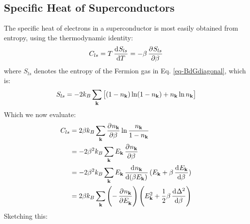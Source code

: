 \subsection{Specific Heat of Superconductors}
The specific heat of electrons in a superconductor is most easily obtained from entropy, using the thermodynamic identity:
\begin{equation}
    C_{ls} = T\dod{S_{ls}}{T} = -\beta\dpd{S_{ls}}{\beta}
\end{equation}
where $S_{ls}$ denotes the entropy of the Fermion gas in Eq. \eqref{eq-BdGdiagonal}, which is:
\begin{equation}
    S_{ls} = -2k_B\sum_{\mathbf{k}}\left[(1-n_{\mathbf{k}})\ln(1 - n_{\mathbf{k}}) + n_{\mathbf{k}}\ln n_{\mathbf{k}}\right]
\end{equation}
Which we now evaluate:
\begin{equation}
    \begin{split}
        C_{ls} &= 2\beta k_B \sum_{\v{k}}\dpd{n_{\v{k}}}{\beta}\ln\frac{n_{\v{k}}}{1 - n_{\v{k}}} 
        \\ &= -2\beta^2 k_B \sum_{\v{k}}E_{\v{k}}\dpd{n_{\v{k}}}{\beta}
        \\ &= -2\beta^2k_B\sum_{\v{k}}E_{\v{k}} \dod{n_{\v{k}}}{(\beta E_{\v{k}})}(E_{\v{k}} + \beta \dod{E_{\v{k}}}{\beta})
        \\ &= 2\beta k_B \sum_{\v{k}}\left(-\dpd{n_{\v{k}}}{E_{\v{k}}}\right)\left(E_{\v{k}}^2 + \frac{1}{2}\beta \dod{\Delta^2}{\beta}\right)
    \end{split}
\end{equation}
Sketching this:

